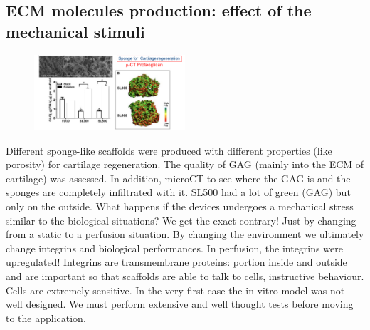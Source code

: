	\subsection{ECM molecules production: effect of the mechanical stimuli}
	\begin{figure}[ht]
\centering
\includegraphics[width=0.5\textwidth]{sponge.png}
\caption{\label{fig:matrixome}}
\end{figure}
	Different sponge-like scaffolds were produced with different properties (like porosity) for cartilage regeneration.
	The quality of GAG (mainly into the ECM of cartilage) was assessed.
	In addition, microCT to see where the GAG is and the sponges are completely infiltrated with it.
	SL500 had a lot of green (GAG) but only on the outside.
	What happens if the devices undergoes a mechanical stress similar to the biological situations? We get the exact contrary! Just by changing from a static to a perfusion situation.
	By changing the environment we ultimately change integrins and biological performances.
	In perfusion, the integrins were upregulated! Integrins are transmembrane proteins: portion inside and outside and are important so that scaffolds are able to talk to cells, instructive behaviour.
	Cells are extremely sensitive.
	In the very first case the in vitro model was not well designed.
	We must perform extensive and well thought tests before moving to the application.
